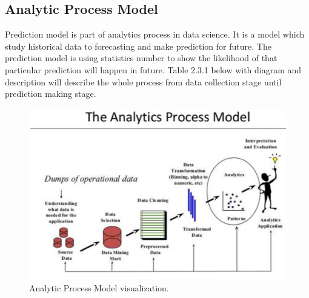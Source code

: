 \documentclass[journal]{IEEEtran}
\begin{document}
\subsection{Analytic Process Model}
Prediction model is part of analytics process in data science. It is a model which study historical data to forecasting and make prediction for future. The prediction model is using statistics number to show the likelihood of that particular prediction will happen in future. Table 2.3.1 below with diagram and description will describe the whole process from data collection stage until prediction making stage.

\begin{figure}[!ht]
	\centering
	\includegraphics[scale=0.4]{analytics}
	\caption{Analytic Process Model visualization.}
\end{figure}
\end{document}
